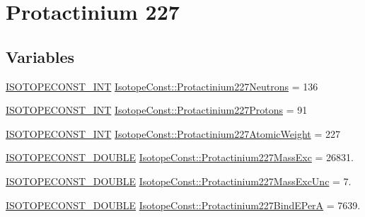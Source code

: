 \hypertarget{group___isotope_const-_protactinium-_pa227}{}\section{Protactinium 227}
\label{group___isotope_const-_protactinium-_pa227}
\subsection*{Variables}
\begin{DoxyCompactItemize}
\item 
\mbox{\hyperlink{group___isotope_const-_macros_ga5f18360b3e99483a35c32d789e62621c}{I\+S\+O\+T\+O\+P\+E\+C\+O\+N\+S\+T\+\_\+\+I\+NT}} \mbox{\hyperlink{group___isotope_const-_protactinium-_pa227_ga0294802d403d792d68ec767531ac75c7}{Isotope\+Const\+::\+Protactinium227\+Neutrons}} = 136
\item 
\mbox{\hyperlink{group___isotope_const-_macros_ga5f18360b3e99483a35c32d789e62621c}{I\+S\+O\+T\+O\+P\+E\+C\+O\+N\+S\+T\+\_\+\+I\+NT}} \mbox{\hyperlink{group___isotope_const-_protactinium-_pa227_gad4eba5ab9613e4eda2cefffce4d8f06e}{Isotope\+Const\+::\+Protactinium227\+Protons}} = 91
\item 
\mbox{\hyperlink{group___isotope_const-_macros_ga5f18360b3e99483a35c32d789e62621c}{I\+S\+O\+T\+O\+P\+E\+C\+O\+N\+S\+T\+\_\+\+I\+NT}} \mbox{\hyperlink{group___isotope_const-_protactinium-_pa227_gac234f61b3b03eb7d107e69adf47ba297}{Isotope\+Const\+::\+Protactinium227\+Atomic\+Weight}} = 227
\item 
\mbox{\hyperlink{group___isotope_const-_macros_ga8f45a7272ce02c0b4c65c44636ed719a}{I\+S\+O\+T\+O\+P\+E\+C\+O\+N\+S\+T\+\_\+\+D\+O\+U\+B\+LE}} \mbox{\hyperlink{group___isotope_const-_protactinium-_pa227_ga7b938113391c9e474499f24c2912b71d}{Isotope\+Const\+::\+Protactinium227\+Mass\+Exc}} = 26831.
\item 
\mbox{\hyperlink{group___isotope_const-_macros_ga8f45a7272ce02c0b4c65c44636ed719a}{I\+S\+O\+T\+O\+P\+E\+C\+O\+N\+S\+T\+\_\+\+D\+O\+U\+B\+LE}} \mbox{\hyperlink{group___isotope_const-_protactinium-_pa227_ga320ff2a16d9277ccf1ca2eb250fc635e}{Isotope\+Const\+::\+Protactinium227\+Mass\+Exc\+Unc}} = 7.
\item 
\mbox{\hyperlink{group___isotope_const-_macros_ga8f45a7272ce02c0b4c65c44636ed719a}{I\+S\+O\+T\+O\+P\+E\+C\+O\+N\+S\+T\+\_\+\+D\+O\+U\+B\+LE}} \mbox{\hyperlink{group___isotope_const-_protactinium-_pa227_gad83127fe5df7fd2f71e4e5a8469790fd}{Isotope\+Const\+::\+Protactinium227\+Bind\+E\+PerA}} = 7639.

\end{DoxyCompactItemize}
